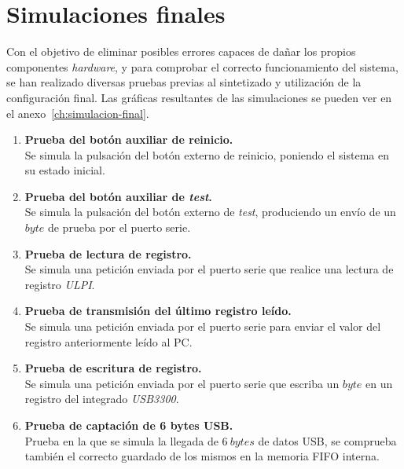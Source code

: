 \section{Simulaciones finales}
Con el objetivo de eliminar posibles errores capaces de dañar los propios componentes \emph{hardware}, y para comprobar el correcto funcionamiento del sistema, se han realizado diversas pruebas previas al sintetizado y utilización de la configuración final. Las gráficas resultantes de las simulaciones se pueden ver en el anexo~\ref{ch:simulacion-final}.

\begin{enumerate}
    \item \textbf{Prueba del botón auxiliar de reinicio.} \\
    Se simula la pulsación del botón externo de reinicio, poniendo el sistema en su estado inicial.
    
    \item \textbf{Prueba del botón auxiliar de \emph{test}.} \\
    Se simula la pulsación del botón externo de \emph{test}, produciendo un envío de un $byte$ de prueba por el puerto serie.

    \item \textbf{Prueba de lectura de registro.} \\
    Se simula una petición enviada por el puerto serie que realice una lectura de registro \emph{ULPI}.
    
    \item \textbf{Prueba de transmisión del último registro leído.} \\
    Se simula una petición enviada por el puerto serie para enviar el valor del registro anteriormente leído al PC.
    
    \item \textbf{Prueba de escritura de registro.} \\
    Se simula una petición enviada por el puerto serie que escriba un $byte$ en un registro del integrado \emph{USB3300}.
    
    \item \textbf{Prueba de captación de 6 bytes USB.}{\label{enum:captacion_6}} \\
    Prueba en la que se simula la llegada de $6~bytes$ de datos USB, se comprueba también el correcto guardado de los mismos en la memoria FIFO interna.
    

\end{enumerate}
